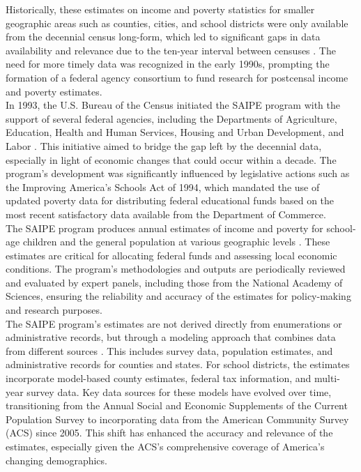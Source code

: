 \documentclass[sn-mathphys-num]{sn-jnl}%
\theoremstyle{thmstyleone}%
\theoremstyle{thmstyletwo}%
\theoremstyle{thmstylethree}%
\begin{document}
Historically, these estimates on income and poverty statistics for smaller geographic areas such as counties, cities, and school districts were only available from the decennial census long-form, which led to significant gaps in data availability and relevance due to the ten-year interval between censuses \cite{saipe_about}. The need for more timely data was recognized in the early 1990s, prompting the formation of a federal agency consortium to fund research for postcensal income and poverty estimates.\\

In 1993, the U.S. Bureau of the Census initiated the SAIPE program with the support of several federal agencies, including the Departments of Agriculture, Education, Health and Human Services, Housing and Urban Development, and Labor \cite{saipe_about}. This initiative aimed to bridge the gap left by the decennial data, especially in light of economic changes that could occur within a decade. The program's development was significantly influenced by legislative actions such as the Improving America's Schools Act of 1994, which mandated the use of updated poverty data for distributing federal educational funds based on the most recent satisfactory data available from the Department of Commerce.\\

The SAIPE program produces annual estimates of income and poverty for school-age children and the general population at various geographic levels \cite{saipe_about}. These estimates are critical for allocating federal funds and assessing local economic conditions. The program's methodologies and outputs are periodically reviewed and evaluated by expert panels, including those from the National Academy of Sciences, ensuring the reliability and accuracy of the estimates for policy-making and research purposes.\\

The SAIPE program's estimates are not derived directly from enumerations or administrative records, but through a modeling approach that combines data from different sources \cite{saipe_about}. This includes survey data, population estimates, and administrative records for counties and states. For school districts, the estimates incorporate model-based county estimates, federal tax information, and multi-year survey data. Key data sources for these models have evolved over time, transitioning from the Annual Social and Economic Supplements of the Current Population Survey to incorporating data from the American Community Survey (ACS) since 2005. This shift has enhanced the accuracy and relevance of the estimates, especially given the ACS's comprehensive coverage of America's changing demographics.\\
\end{document}
